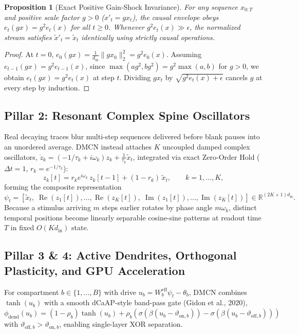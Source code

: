 \documentclass[11pt,a4paper]{article}
\newtheorem{proposition}{Proposition}
\begin{document}
\begin{proposition}[Exact Positive Gain-Shock Invariance]
For any sequence $x_{0:T}$ and positive scale factor $g > 0$ ($x'_t = g x_t$), the causal envelope obeys $e_t(gx) = g^2 e_t(x)$ for all $t \ge 0$. Whenever $g^2 e_t(x) \gg \epsilon$, the normalized stream satisfies $\tilde{x}'_t = \tilde{x}_t$ identically using strictly causal operations.
\end{proposition}
\begin{proof}
At $t=0$, $e_0(gx) = \frac{1}{d_{\text{in}}}\|gx_0\|_2^2 = g^2 e_0(x)$. Assuming $e_{t-1}(gx) = g^2 e_{t-1}(x)$, since $\max(ag^2, bg^2) = g^2\max(a,b)$ for $g > 0$, we obtain $e_t(gx) = g^2 e_t(x)$ at step $t$. Dividing $gx_t$ by $\sqrt{g^2 e_t(x)+\epsilon}$ cancels $g$ at every step by induction.
\end{proof}

\subsection{Pillar 2: Resonant Complex Spine Oscillators}
Real decaying traces blur multi-step sequences delivered before blank pauses into an unordered average. DMCN instead attaches $K$ uncoupled damped complex oscillators, $\dot{z}_k = (-1/\tau_k + i\omega_k)z_k + \frac{1}{\tau_k}\tilde{x}_t$, integrated via exact Zero-Order Hold ($\Delta t = 1$, $r_k = e^{-1/\tau_k}$):
\begin{equation}
z_k[t] = r_k e^{i\omega_k}\, z_k[t-1] + (1 - r_k)\,\tilde{x}_t, \qquad k = 1, \dots, K,
\end{equation}
forming the composite representation
\begin{equation}
\psi_t = \left[\tilde{x}_t,\; \operatorname{Re}(z_1[t]), \dots, \operatorname{Re}(z_K[t]),\; \operatorname{Im}(z_1[t]), \dots, \operatorname{Im}(z_K[t])\right] \in \mathbb{R}^{(2K+1)d_{\text{in}}}.
\end{equation}
Because a stimulus arriving $m$ steps earlier rotates by phase angle $m\omega_k$, distinct temporal positions become linearly separable cosine-sine patterns at readout time $T$ in fixed $O(K d_{\text{in}})$ state.

\subsection{Pillar 3 \& 4: Active Dendrites, Orthogonal Plasticity, and GPU Acceleration}
For compartment $b \in \{1,\dots,B\}$ with drive $u_b = W_b^{\text{eff}}\psi_t - \theta_b$, DMCN combines $\tanh(u_b)$ with a smooth dCaAP-style band-pass gate (Gidon et al., 2020), $\phi_{\text{dend}}(u_b) = (1-\rho_b)\tanh(u_b) + \rho_b(\sigma(\beta(u_b-\vartheta_{\text{on},b})) - \sigma(\beta(u_b-\vartheta_{\text{off},b})))$ with $\vartheta_{\text{off},b} > \vartheta_{\text{on},b}$, enabling single-layer XOR separation.
\end{document}
